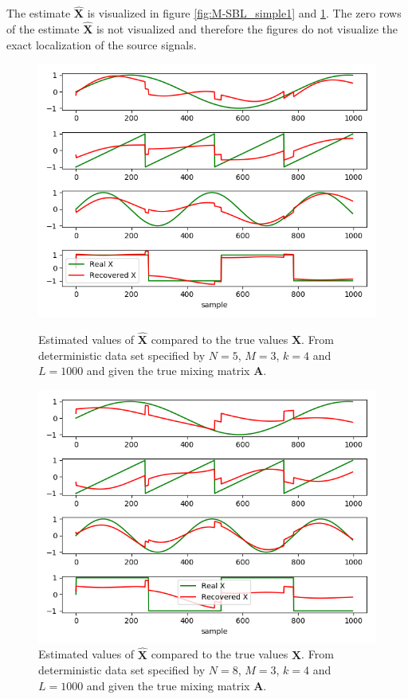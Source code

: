The estimate $\hat{\mathbf{X}}$ is visualized in figure \ref{fig:M-SBL_simple1} and \ref{fig:M-SBL_simple2}. 
The zero rows of the estimate $\hat{\mathbf{X}}$ is not visualized and therefore the figures do not visualize the exact localization of the source signals.
\begin{figure}[H]
\begin{widepage}
    \begin{minipage}[t]{.45\textwidth}
    	\centering
		\includegraphics[scale=0.45]{figures/ch_6/M-SBL_simple1.png}
		\caption{Estimated values of $\hat{\mathbf{X}}$ compared to the true 					values $\mathbf{X}$. From deterministic data set specified by $N = 5$, $M = 3$, $k = 4$ and $L = 1000$ and given the true mixing matrix $\mathbf{A}$.}
		\label{fig:M-SBL_simple1}
    \end{minipage} 
    \hfill
    \begin{minipage}[t]{.45\textwidth}
        \centering
		\includegraphics[scale=0.45]{figures/ch_6/M-SBL_simple2.png}
		\caption{Estimated values of $\hat{\mathbf{X}}$ compared to the true values $\mathbf{X}$. From deterministic data set specified by $N = 8$, $M = 3$, $k = 4$ and $L = 1000$ and given the true mixing matrix $\mathbf{A}$.}
		\label{fig:M-SBL_simple2}
    \end{minipage}
\end{widepage}
\end{figure}
